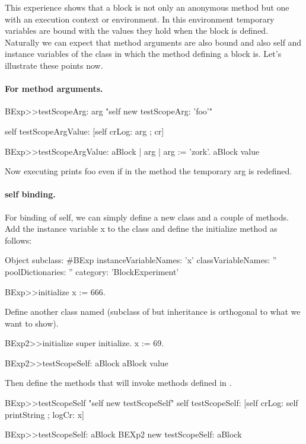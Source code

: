 \documentclass[a4paper,10pt,twoside]{book}
\begin{document}
This experience shows that a block is not only an anonymous method but one with an execution context or environment. In this environment temporary variables are bound with the values they hold when the block 
is defined. Naturally we can expect that method arguments are also bound and also self and instance variables of the class in which the method defining a block is. Let's illustrate these points now. 

\paragraph{For method arguments.}

\begin{code}{}
BExp>>testScopeArg: arg
	"self new testScopeArg: 'foo'"
	
	self testScopeArgValue: [self crLog: arg ; cr]

BExp>>testScopeArgValue: aBlock
	| arg | 
	arg := 'zork'.
	aBlock value
\end{code}

Now executing  prints foo even if in the method  the temporary arg is redefined.
 

\paragraph{self binding.}
For binding of self, we can simply define a new class and a couple of methods. 
Add the instance variable x to the class  and define the initialize method as follows:

\begin{code}{}
Object subclass: #BExp
	instanceVariableNames: 'x'
	classVariableNames: ''
	poolDictionaries: ''
	category: 'BlockExperiment'
\end{code}


\begin{code}{}
BExp>>initialize
	x := 666.
\end{code}	

Define another class named  (subclass of  but inheritance is orthogonal to what we want to show).


\begin{code}{}
BExp2>>initialize
	super initialize.
	x := 69.

BExp2>>testScopeSelf: aBlock
	aBlock value
\end{code}

Then define the methods that will invoke  methods defined in .
\begin{code}{}	
BExp>>testScopeSelf
	"self new testScopeSelf"
	self testScopeSelf: [self crLog: self printString ; logCr: x]

BExp>>testScopeSelf: aBlock
	BEXp2 new testScopeSelf: aBlock
\end{code}	
\end{document}

